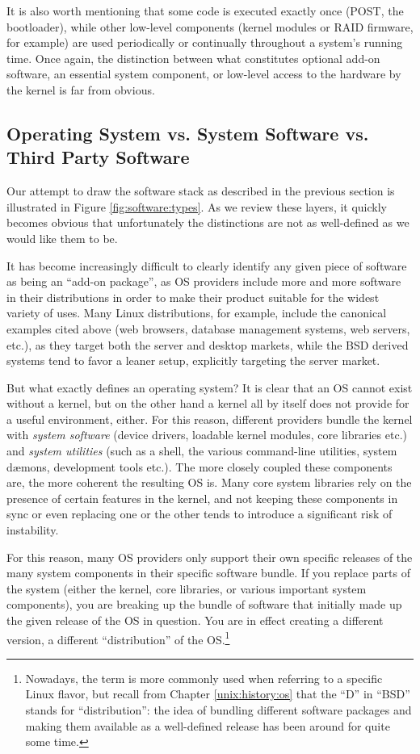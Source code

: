 It is also worth mentioning that some code is executed
exactly once (POST, the bootloader), while other
low-level components (kernel modules or RAID firmware,
for example) are used periodically or continually
throughout a system's running time.  Once again, the
distinction between what constitutes optional add-on
software, an essential system component, or low-level
access to the hardware by the kernel is far from
obvious.

\subsection{Operating System vs. System Software vs. Third Party Software}
\label{software-installation:system-vs-third-party}

Our attempt to draw the software stack as described in
the previous section is illustrated in Figure
\ref{fig:software:types}.  As we review these layers,
it quickly becomes obvious that unfortunately the
distinctions are not as well-defined as we would like
them to be.

It has become increasingly difficult to clearly
identify any given piece of software as being an
``add-on package'', as OS providers include more and
more software in their distributions in order to make
their product suitable for the widest variety of uses.
Many Linux distributions, for example, include the
canonical examples cited above (web browsers, database
management systems, web servers, etc.), as they target
both the server and desktop markets, while the BSD
derived systems tend to favor a leaner setup,
explicitly targeting the server market.

But what exactly defines an operating system?  It is
clear that an OS cannot exist without a kernel, but on
the other hand a kernel all by itself does not provide
for a useful environment, either.  For this reason,
different providers bundle the kernel with {\em system
software} (device drivers, loadable kernel modules,
core libraries etc.) and {\em system utilities} (such
as a shell, the various command-line utilities, system
d\ae mons, development tools etc.).  The more closely
coupled these components are, the more coherent the
resulting OS is.  Many core system libraries rely on
the presence of certain features in the kernel, and
not keeping these components in sync or even replacing
one or the other tends to introduce a significant risk
of instability.

For this reason, many OS providers only support their
own specific releases of the many system components in
their specific software bundle.  If you replace parts
of the system (either the kernel, core libraries, or
various important system components), you are breaking
up the bundle of software that initially made up the
given release of the OS in question.  You are in
effect creating a different version, a different
``distribution'' of the OS.\footnote{ Nowadays, the
term is more commonly used when referring to a
specific Linux flavor, but recall from Chapter
\ref{unix:history:os} that the ``D'' in ``BSD'' stands
for ``distribution'': the idea of bundling different
software packages and making them available as a
well-defined release has been around for quite some
time.}

